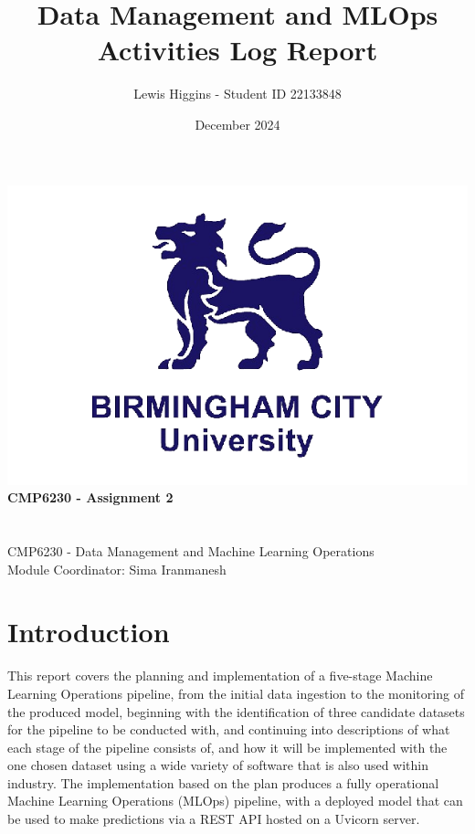 \documentclass[12pt]{report}
\title{Data Management and MLOps Activities Log Report}
\author{Lewis Higgins - Student ID 22133848}
\date{December 2024}
\begin{document}
\makeatletter
\begin{titlepage}
    \begin{center}
        \includegraphics[width=0.7\linewidth]{BCU}\\[4ex]
        {\huge \bfseries CMP6230 - Assignment 2}\\[2ex]
        {\large \bfseries  \@title}\\[50ex]
        {\@author}\\[2ex]
        {CMP6230 - Data Management and Machine Learning Operations}\\[2ex]
        {Module Coordinator: Sima Iranmanesh}\\[10ex]
    \end{center}
\end{titlepage}
\makeatother
\thispagestyle{empty}
\newpage


\setcounter{page}{0}

\tableofcontents
\thispagestyle{empty}

\chapter*{Introduction}
This report covers the planning and implementation of a five-stage Machine Learning Operations pipeline, from the initial 
data ingestion to the monitoring of the produced model, beginning 
with the identification of three candidate datasets for the pipeline to be conducted with, and continuing 
into descriptions of what each stage of the pipeline consists of, and how it will be implemented with the
one chosen dataset using a wide variety of software that is also used within industry. The implementation 
based on the plan produces a fully operational Machine Learning Operations (MLOps) pipeline, with a deployed model 
that can be used to make predictions via a REST API hosted on a Uvicorn server.
\end{document}
